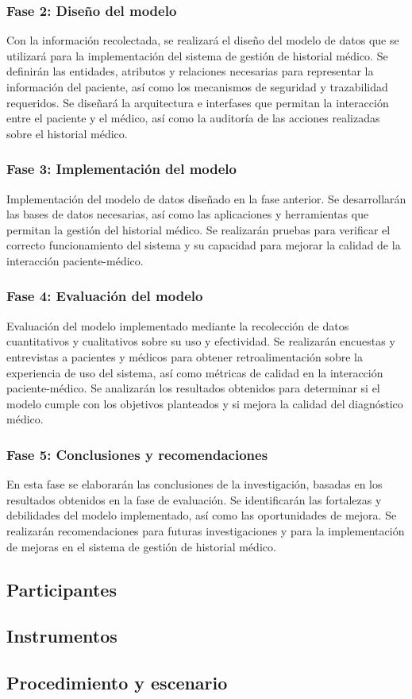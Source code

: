     \subsubsection{Fase 2: Diseño del modelo}
    Con la información recolectada, se realizará el diseño del  modelo de datos que se utilizará para la implementación del sistema de gestión de historial médico. Se definirán las entidades, atributos y relaciones necesarias para representar la información del paciente, así como los mecanismos de seguridad y trazabilidad requeridos. Se diseñará la arquitectura e interfases que permitan la interacción entre el paciente y el médico, así como la auditoría de las acciones realizadas sobre el historial médico.
    \subsubsection{Fase 3: Implementación del modelo}
    Implementación del modelo de datos diseñado en la fase anterior. Se desarrollarán las bases de datos necesarias, así como las aplicaciones y herramientas que permitan la gestión del historial médico. Se realizarán pruebas para verificar el correcto funcionamiento del sistema y su capacidad para mejorar la calidad de la interacción paciente-médico.
    \subsubsection{Fase 4: Evaluación del modelo}
    Evaluación del modelo implementado mediante la recolección de datos cuantitativos y cualitativos sobre su uso y efectividad. Se realizarán encuestas y entrevistas a pacientes y médicos para obtener retroalimentación sobre la experiencia de uso del sistema, así como métricas de calidad en la interacción paciente-médico. Se analizarán los resultados obtenidos para determinar si el modelo cumple con los objetivos planteados y si mejora la calidad del diagnóstico médico.
    \subsubsection{Fase 5: Conclusiones y recomendaciones}
    En esta fase se elaborarán las conclusiones de la investigación, basadas en los resultados obtenidos en la fase de evaluación. Se identificarán las fortalezas y debilidades del modelo implementado, así como las oportunidades de mejora. Se realizarán recomendaciones para futuras investigaciones y para la implementación de mejoras en el sistema de gestión de historial médico.

    
    \subsection{Participantes}
    \subsection{Instrumentos}
    \subsection{Procedimiento y escenario}